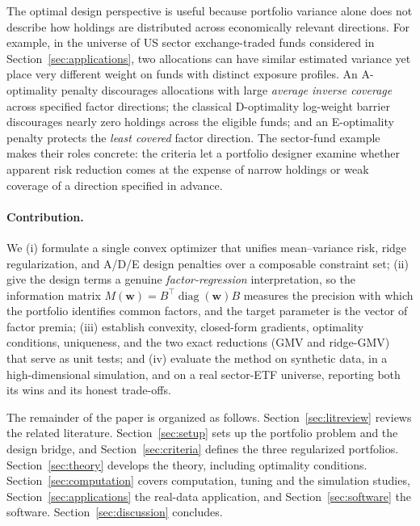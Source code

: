 \documentclass[11pt]{article}
\newcommand{\diag}{\operatorname{diag}}
\newcommand{\w}{\mathbf{w}}
\newcommand{\M}{M(\w)}
\begin{document}
The optimal design perspective is useful because portfolio variance alone does not describe how holdings are distributed across economically relevant directions. For example, in the universe of US sector exchange-traded funds considered in Section~\ref{sec:applications}, two allocations can have similar estimated variance yet place very different weight on funds with distinct exposure profiles. An A-optimality penalty discourages allocations with large \emph{average inverse coverage} across specified factor directions; the classical D-optimality log-weight barrier discourages nearly zero holdings across the eligible funds; and an E-optimality penalty protects the \emph{least covered} factor direction.
The sector-fund example makes their roles concrete: the criteria let a portfolio designer examine whether apparent risk reduction comes at the expense of narrow holdings or weak coverage of a direction specified in advance.

\paragraph{Contribution.} We (i) formulate a single convex optimizer that unifies
mean--variance risk, ridge regularization, and A/D/E design penalties over a
composable constraint set; (ii) give the design terms a genuine
\emph{factor-regression} interpretation, so the information matrix
$\M=B^\top\diag(\w)B$ measures the precision with which the portfolio identifies
common factors, and the target parameter is the vector of factor premia;
(iii) establish convexity, closed-form gradients, optimality conditions, uniqueness, and
the two exact reductions (GMV and ridge-GMV) that serve as unit tests; and
(iv) evaluate the method on synthetic data, in a high-dimensional simulation, and
on a real sector-ETF universe, reporting both its wins and its honest
trade-offs.

The remainder of the paper is organized as follows.
Section~\ref{sec:litreview} reviews the related literature.
Section~\ref{sec:setup} sets up the portfolio problem and the design bridge, and
Section~\ref{sec:criteria} defines the three regularized portfolios.
Section~\ref{sec:theory} develops the theory, including optimality conditions.
Section~\ref{sec:computation} covers computation, tuning and the simulation
studies, Section~\ref{sec:applications} the real-data application, and
Section~\ref{sec:software} the software. Section~\ref{sec:discussion} concludes.

\end{document}
